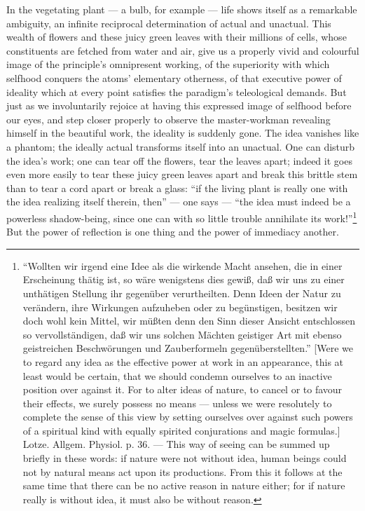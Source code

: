\documentclass[12pt,a4paper]{book}
\begin{document}
In the vegetating plant --- a bulb, for example --- life shows itself as a
remarkable ambiguity, an infinite reciprocal determination of actual and unactual.
This wealth of flowers and these juicy green leaves with their millions of cells,
whose constituents are fetched from water and air, give us a properly vivid and
colourful image of the principle's omnipresent working, of the superiority with
which selfhood conquers the atoms' elementary otherness, of that executive power
of ideality which at every point satisfies the paradigm's teleological demands.
But just as we involuntarily rejoice at having this expressed image of selfhood
before our eyes, and step closer properly to observe the master-workman revealing
himself in the beautiful work, the ideality is suddenly gone. The idea vanishes
like a phantom; the ideally actual transforms itself into an unactual. One can
disturb the idea's work; one can tear off the flowers, tear the leaves apart;
indeed it goes even more easily to tear these juicy green leaves apart and break
this brittle stem than to tear a cord apart or break a glass: ``if the living
plant is really one with the idea realizing itself
\setcounter{footnote}{0}
therein, then'' --- one says --- ``the idea must indeed be a powerless shadow-being,
since one can with so little trouble annihilate its work!''\footnote{``Wollten wir
irgend eine Idee als die wirkende Macht ansehen, die in einer Erscheinung thätig
ist, so wäre wenigstens dies gewiß, daß wir uns zu einer unthätigen Stellung ihr
gegenüber verurtheilten. Denn Ideen der Natur zu verändern, ihre Wirkungen
aufzuheben oder zu begünstigen, besitzen wir doch wohl kein Mittel, wir müßten
denn den Sinn dieser Ansicht entschlossen so vervollständigen, daß wir uns
solchen Mächten geistiger Art mit ebenso geistreichen Beschwörungen und
Zauberformeln gegenüberstellten.'' [Were we to regard any idea as the effective
power at work in an appearance, this at least would be certain, that we should
condemn ourselves to an inactive position over against it. For to alter ideas of
nature, to cancel or to favour their effects, we surely possess no means --- unless
we were resolutely to complete the sense of this view by setting ourselves over
against such powers of a spiritual kind with equally spirited conjurations and
magic formulas.] Lotze. Allgem. Physiol. p. 36. --- This way of seeing can be
summed up briefly in these words: if nature were not without idea, human beings
could not by natural means act upon its productions. From this it follows at the
same time that there can be no active reason in nature either; for if nature really
is without idea, it must also be without reason.} But the power of reflection is
one thing and the power of immediacy another.
\end{document}
